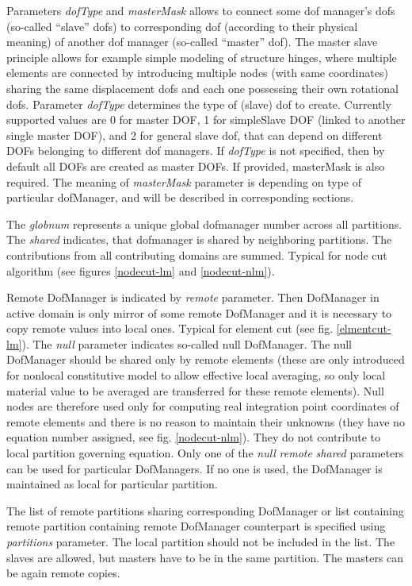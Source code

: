 \documentclass[draft]{article}
\newcommand{\param}[1]{{\em #1}}
\newcommand{\Pmode}[1]{{\sffamily #1}}
\begin{document}
Parameters \param{dofType} and \param{masterMask} allows to connect some dof manager's dofs
(so-called ``slave'' dofs)
to corresponding dof (according to their physical meaning) of another
dof manager (so-called ``master'' dof). The master slave principle
allows for example simple modeling of structure hinges, where multiple
elements are connected by introducing multiple nodes (with same
coordinates) sharing the same displacement dofs and each one possessing
their own rotational dofs.
Parameter
\param{dofType} determines the type of (slave) dof to
create. Currently supported values are 0 for master DOF, 1 for simpleSlave DOF (linked to another single master DOF), and 2 for general
slave dof, that can depend on different DOFs belonging to different
dof managers. 
If \param{dofType} is not specified, then by default all DOFs are
created as master DOFs. If provided, masterMask is also required. 
The meaning of \param{masterMask} parameter is
depending on type of particular dofManager, and will be described in
corresponding sections.

\Pmode{
The \param{globnum} represents a unique global dofmanager number across all partitions.
The \param{shared} indicates, that dofmanager is shared by
neighboring partitions. The contributions from all contributing
domains are summed. Typical for node cut algorithm (see figures \ref{nodecut-lm}
and \ref{nodecut-nlm}).

Remote DofManager is indicated by \param{remote} parameter.
Then DofManager in active domain is only mirror of some remote
DofManager and it is necessary to copy remote values into local
ones. Typical for element cut (see fig. \ref{elmentcut-lm}).
The \param{null} parameter indicates so-called null DofManager. The
null DofManager should be shared only by remote elements (these are
only introduced for nonlocal constitutive model to allow effective
local averaging, so only local material value to be averaged are
transferred for these remote elements). Null nodes are therefore used
only for computing real integration point coordinates of remote
elements and there is no reason to maintain their unknowns (they have
no equation number assigned, see fig. \ref{nodecut-nlm}). They do not
contribute to local partition governing equation.
Only one of the \param{null} \param{remote} \param{shared} parameters can
be used for particular DofManagers. If no one is used, the DofManager
is maintained as local for particular partition.

The list of remote partitions sharing corresponding DofManager or list
containing  remote partition containing remote DofManager counterpart is
specified using \param{partitions} parameter. The local partition
should not be included in the list.
The slaves are allowed, but masters have to be in the same
partition. The masters can be again remote copies.
}
\end{document}
